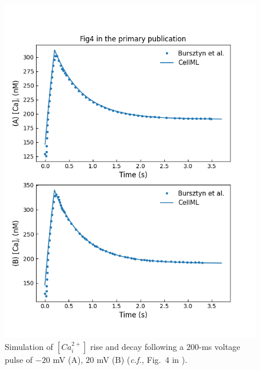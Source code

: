 \documentclass[fleqn,10pt]{physiome}
\begin{document}
\begin{figure}
\centering
\begin{minipage}[t]{\dimexpr.5\textwidth-0.2em}
  \centering
 \includegraphics[width=\linewidth]{./figs/simFig4.png}
\caption{Simulation of $[Ca_{i}^{2+}]$ rise and decay following a $200$-ms voltage pulse of $-20$ mV (A), $20$ mV (B) (\emph{c.f.,} Fig.~4 in \citet{bursztyn2007mathematical}).}
\label{simFig4}
\end{minipage}\hfill
\begin{minipage}[t]{\dimexpr.5\textwidth-0.2em}
  \centering

\end{minipage}
\end{figure}
\end{document}
